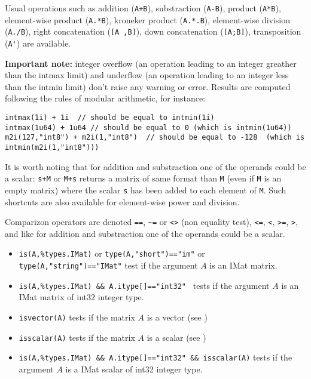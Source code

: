 
Usual operations such as addition (\verb-A+B-), substraction  (\verb+A-B+), product (\verb+A*B+), 
element-wise product (\verb+A.*B+), kroneker product (\verb+A.*.B+),
element-wise division (\verb+A./B+), right concatenation  (\verb+[A ,B]+), down concatenation  (\verb+[A;B]+), 
transposition (\verb+A'+) are available. 

{\bf Important note:} integer overflow (an operation leading to an integer greather than
the intmax limit) and underflow  (an operation leading to an integer less than
the intmin limit) don't raise any warning or error. Results are computed following the
rules of modular arithmetic, for instance:
\begin{Verbatim}
intmax(1i) + 1i  // should be equal to intmin(1i)
intmax(1u64) + 1u64 // should be equal to 0 (which is intmin(1u64))
m2i(127,"int8") + m2i(1,"int8")  // should be equal to -128  (which is intmin(m2i(1,"int8")))
\end{Verbatim}

It is worth noting that for addition and substraction one of the operands could be a scalar:
\verb=s+M= or \verb=M+s= returns a matrix of same format than \verb+M+
(even if \verb+M+ is an empty matrix) where the scalar \verb=s= has been added to each
element of \verb+M+. Such shortcuts are also available for element-wise power and division. 

Comparizon operators are denoted \verb+==+, \verb+~=+ or  \verb+<>+ (non equality test), 
\verb+<=+, \verb+<+, \verb+>=+, \verb+>+, and like for  addition and substraction one of
the operands could be a scalar. 

\begin{itemize}
    \item \verb+is(A,%types.IMat)+ or \verb+type(A,"short")=="im"+ or \verb+type(A,"string")=="IMat"+ 
     test if the argument $A$ is an IMat matrix.
    \item \verb+is(A,%types.IMat) && A.itype[]=="int32" + tests if the argument $A$ is an IMat matrix of int32 integer type.
    \item \verb+isvector(A)+ tests if the matrix $A$ is a vector (see )
    \item \verb+isscalar(A)+ tests if the matrix $A$ is a scalar (see )
    \item \verb+is(A,%types.IMat) && A.itype[]=="int32" && isscalar(A)+ tests if the argument $A$ is a IMat scalar of
                     int32 integer type.
\end{itemize}

